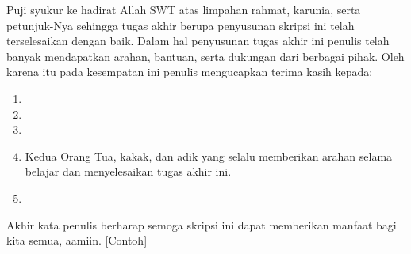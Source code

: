 Puji syukur ke hadirat Allah SWT atas limpahan rahmat, karunia, serta petunjuk-Nya sehingga tugas akhir berupa penyusunan skripsi ini telah terselesaikan dengan baik. Dalam hal penyusunan tugas akhir ini penulis telah banyak mendapatkan arahan, bantuan, serta dukungan dari berbagai pihak. Oleh karena itu pada kesempatan ini penulis mengucapkan terima kasih kepada:

\begin{enumerate}
	\item <isi dengan nama Kadep>
	
	\item <isi dengan nama Sekdep>
	
	\item <isi dengan nama Dosen Pembimbing>
	
	\item Kedua Orang Tua, kakak, dan adik yang selalu memberikan arahan selama belajar dan menyelesaikan tugas akhir ini. 
	
	\item <isi dengan nama orang lainnya>

\end{enumerate}

Akhir kata penulis berharap semoga skripsi ini dapat memberikan manfaat bagi kita semua, aamiin. [Contoh]

